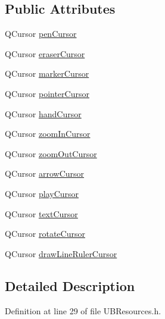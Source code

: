 \subsection*{Public Attributes}
\begin{DoxyCompactItemize}
\item 
Q\-Cursor \hyperlink{class_u_b_resources_a498cda238b893be4af2c5f692e015247}{pen\-Cursor}
\item 
Q\-Cursor \hyperlink{class_u_b_resources_a84824b970a369ad44df93b32b5c4c296}{eraser\-Cursor}
\item 
Q\-Cursor \hyperlink{class_u_b_resources_a833fbc6e776701f9c3e45b4a286a1d70}{marker\-Cursor}
\item 
Q\-Cursor \hyperlink{class_u_b_resources_aeb58734a86bc61559d8d2b561f2aa092}{pointer\-Cursor}
\item 
Q\-Cursor \hyperlink{class_u_b_resources_af9aebbfa5288b8428b4684cb38e7b85c}{hand\-Cursor}
\item 
Q\-Cursor \hyperlink{class_u_b_resources_a93fb66f40e17870cbd56579f528f9667}{zoom\-In\-Cursor}
\item 
Q\-Cursor \hyperlink{class_u_b_resources_a83e6b8bd0380901222ea318c647290f7}{zoom\-Out\-Cursor}
\item 
Q\-Cursor \hyperlink{class_u_b_resources_abf16c4c391a562aed1b995c44e263624}{arrow\-Cursor}
\item 
Q\-Cursor \hyperlink{class_u_b_resources_a05d5101d1cc71a40f502fd285ad54f86}{play\-Cursor}
\item 
Q\-Cursor \hyperlink{class_u_b_resources_a3c7b9b13f2adc873f577fac9a30093c7}{text\-Cursor}
\item 
Q\-Cursor \hyperlink{class_u_b_resources_ab236f6e21733987cf38e8d2d3f35b341}{rotate\-Cursor}
\item 
Q\-Cursor \hyperlink{class_u_b_resources_a9e69d6645d67e7a42e6dcc5773470740}{draw\-Line\-Ruler\-Cursor}
\end{DoxyCompactItemize}


\subsection{Detailed Description}


Definition at line 29 of file U\-B\-Resources.\-h.



